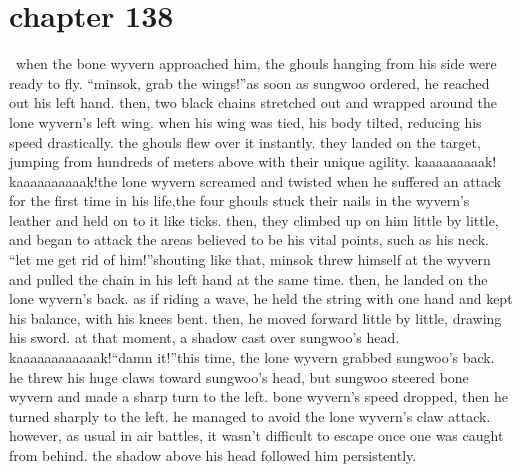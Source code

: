 \section{chapter 138}






 when the bone wyvern approached him, the ghouls hanging from his side were ready to fly.
“minsok, grab the wings!”as soon as sungwoo ordered, he reached out his left hand.
then, two black chains stretched out and wrapped around the lone wyvern’s left wing.
when his wing was tied, his body tilted, reducing his speed drastically.
the ghouls flew over it instantly.
 they landed on the target, jumping from hundreds of meters above with their unique agility.
kaaaaaaaaak! kaaaaaaaaaak!the lone wyvern screamed and twisted when he suffered an attack for the first time in his life,the four ghouls stuck their nails in the wyvern’s leather and held on to it like ticks.
then, they climbed up on him little by little, and began to attack the areas believed to be his vital points, such as his neck.
“let me get rid of him!”shouting like that, minsok threw himself at the wyvern and pulled the chain in his left hand at the same time.
 then, he landed on the lone wyvern’s back.
as if riding a wave, he held the string with one hand and kept his balance, with his knees bent.
 then, he moved forward little by little, drawing his sword.
at that moment, a shadow cast over sungwoo’s head.
kaaaaaaaaaaaak!“damn it!”this time, the lone wyvern grabbed sungwoo’s back.
 he threw his huge claws toward sungwoo’s head, but sungwoo steered bone wyvern and made a sharp turn to the left.
bone wyvern’s speed dropped, then he turned sharply to the left.
 he managed to avoid the lone wyvern’s claw attack.
however, as usual in air battles, it wasn’t difficult to escape once one was caught from behind.
 the shadow above his head followed him persistently.

